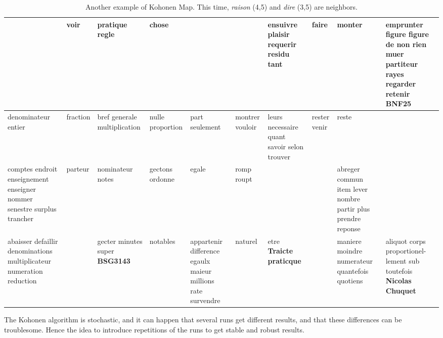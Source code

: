 \documentclass[preprint]{elsarticle}
\begin{document}
\begin{table}[ht!]
{\begin{tabular}{|p{1.95cm}|p{1.9cm}|p{1.95cm}|p{1.88cm}|p{1.88cm}|p{1.88cm}|p{1.88cm}|p{1.88cm}|p{1.88cm}|p{1.88cm}|}
 & voir & pratique regle & chose & & & ensuivre plaisir requerir residu tant & faire & monter & emprunter figure figure de non rien muer partiteur rayes regarder retenir \cellcolor{grisclair} \textbf{BNF25} \\ \hline
 denominateur entier & fraction & bref generale multiplication & nulle proportion & part seulement & montrer vouloir & leurs necessaire quant savoir selon trouver & rester venir & reste & \\ \hline
 comptes endroit enseignement enseigner nommer senestre surplus trancher & parteur & nominateur notes & gectons ordonne & egale & romp roupt & & & abreger commun item lever nombre partir plus prendre reponse & \\ \hline
 abaisser defaillir denominations multiplicateur numeration reduction & & gecter minutes super \cellcolor{grisclair} \textbf{BSG3143} & notables & appartenir difference egaulx maieur millions rate survendre & naturel & etre \cellcolor{grisclair} \textbf{Traicte praticque} & & maniere moindre numerateur quantefois quotiens & aliquot corps proportionel- lement sub toutefois \cellcolor{grisclair} \textbf{Nicolas Chuquet}\\
\hline
\end{tabular}
}
\caption{Another example of Kohonen Map. This time, \textit{raison} (4,5) and \textit{dire} (3,5) are neighbors.}
\label{tab:koho2}
\end{table}


The Kohonen algorithm is stochastic, and it can  happen that several runs get different results, and that these differences can be troublesome. Hence the idea to introduce repetitions of the runs to get stable and robust results.
\end{document}

